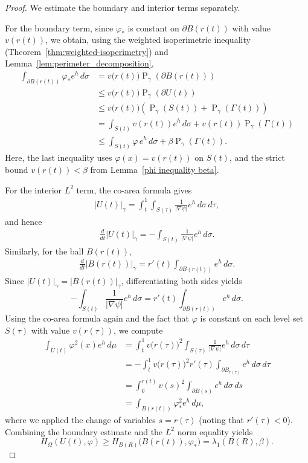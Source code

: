 \documentclass[11pt,leqno]{amsart}
\numberwithin{equation}{section}
\begin{document}
\begin{proof}
We estimate the boundary and interior terms separately.

For the boundary term, since $\varphi_*$ is constant on $\partial B(r(t))$ with value $v(r(t))$, we obtain, using the weighted isoperimetric inequality (Theorem~\ref{thm:weighted-isoperimetry}) and Lemma~\ref{lem:perimeter_decomposition},
\begin{align*}
\int_{\partial B(r(t))}\varphi_{*}e^{h}\,d\sigma
&= v\big(r(t)\big) \operatorname{P}_\gamma(\partial B(r(t))) \\
&\leq v\big(r(t)\big) \operatorname{P}_\gamma(\partial U(t)) \\
&\leq v\big(r(t)\big) \left( \operatorname{P}_\gamma(S(t)) + \operatorname{P}_\gamma(\Gamma(t)) \right) \\
&= \int_{S(t)} v(r(t)) e^{h}\,d\sigma + v(r(t)) \operatorname{P}_\gamma(\Gamma(t)) \\
&\leq \int_{S(t)}\varphi \, e^{h}\,d\sigma + \beta \operatorname{P}_\gamma(\Gamma(t)).
\end{align*}
Here, the last inequality uses  $\varphi(x) = v(r(t))$ on $S(t)$, and the strict bound $v(r(t)) < \beta$ from Lemma~\ref{phi inequality beta}.

For the interior $L^{2}$ term, the co-area formula gives
\begin{align*}
|U(t)|_{\gamma} = \int_{t}^{1}\int_{S(\tau)}\frac{1}{|\nabla \psi|}e^{h}\,d\sigma\,d\tau,
\end{align*}
and hence
\begin{align*}
\frac{d}{dt}|U(t)|_{\gamma} = -\int_{S(t)}\frac{1}{|\nabla \psi|}e^{h}\,d\sigma.
\end{align*}
Similarly, for the ball $B(r(t))$,
\begin{align*}
\frac{d}{dt}|B(r(t))|_{\gamma} = r'(t)\int_{\partial B(r(t))}e^{h}\,d\sigma.
\end{align*}
Since $|U(t)|_{\gamma}=|B(r(t))|_{\gamma}$, differentiating both sides yields
\begin{equation*}
-\int_{S(t)}\frac{1}{|\nabla \psi|}e^{h}\,d\sigma = r'(t)\int_{\partial B(r(t))}e^{h}\,d\sigma.
\end{equation*}
Using the co-area formula again and the fact that $\varphi$ is constant on each level set $S(\tau)$ with value $v(r(\tau))$, we compute
\begin{align*}
\int_{U(t)}\varphi^{2}(x)e^{h}\,d\mu
&= \int_{t}^{1} v\big(r(\tau)\big)^{2} \int_{S(\tau)}\frac{1}{|\nabla\psi|}e^{h}\,d\sigma\,d\tau \\
&= -\int_{t}^{1} v\big(r(\tau)\big)^{2} r'(\tau)\int_{\partial B_{r(\tau)}}e^{h}\,d\sigma\,d\tau \\
&= \int_{0}^{r(t)} v(s)^{2}\int_{\partial B(s)}e^{h}\,d\sigma\,ds \\
&= \int_{B(r(t))}\varphi_{*}^{2}e^{h}\,d\mu,
\end{align*}
where we applied the change of variables $s = r(\tau)$ (noting that $r'(\tau) < 0$). 
Combining the boundary estimate and the $L^{2}$ norm equality yields $$H_{\Omega}(U(t),\varphi) \geq H_{B(R)}\big(B(r(t)),\varphi_{*}\big) = \lambda_{1}(B(R),\beta).$$


\end{proof}
\end{document}
